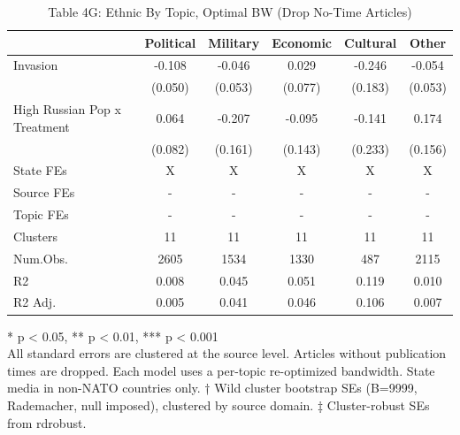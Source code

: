 \begin{table}[t]
\caption{\label{tab:table4g}Table 4G: Ethnic By Topic, Optimal BW (Drop No-Time Articles)} 
\fontsize{12.0pt}{14.0pt}\selectfont
\begin{tabular*}{\linewidth}{@{\extracolsep{\fill}}lccccc}
\toprule
  & Political & Military & Economic & Cultural & Other \\ 
\midrule\addlinespace[2.5pt]
Invasion & -0.108 & -0.046 & 0.029 & -0.246 & -0.054 \\ 
 & (0.050) & (0.053) & (0.077) & (0.183) & (0.053) \\ 
High Russian Pop x Treatment & 0.064 & -0.207 & -0.095 & -0.141 & 0.174 \\ 
{} & {(0.082)} & {(0.161)} & {(0.143)} & {(0.233)} & {(0.156)} \\ 
State FEs & X & X & X & X & X \\ 
Source FEs & - & - & - & - & - \\ 
Topic FEs & - & - & - & - & - \\ 
Clusters & 11 & 11 & 11 & 11 & 11 \\ 
Num.Obs. & 2605 & 1534 & 1330 & 487 & 2115 \\ 
R2 & 0.008 & 0.045 & 0.051 & 0.119 & 0.010 \\ 
R2 Adj. & 0.005 & 0.041 & 0.046 & 0.106 & 0.007 \\ 
\bottomrule
\end{tabular*}
\begin{minipage}{\linewidth}
\vspace{.05em}
* p < 0.05, ** p < 0.01, *** p < 0.001\\
All standard errors are clustered at the source level. Articles without
publication times are dropped. Each model uses a per-topic re-optimized
bandwidth. State media in non-NATO countries only. † Wild cluster bootstrap SEs
(B=9999, Rademacher, null imposed), clustered by source domain. ‡ Cluster-robust
SEs from rdrobust.\\
\end{minipage}
\end{table}

